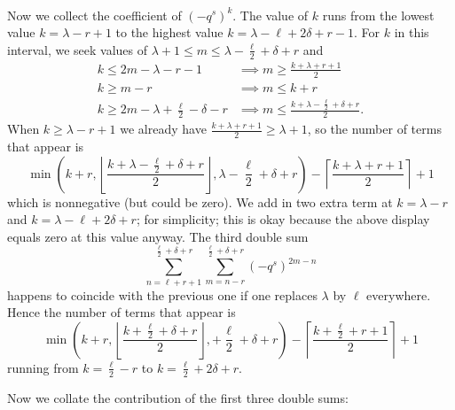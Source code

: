 \begin{itemize}
\begin{align*}
  \end{align*}
  Now we collect the coefficient of $(-q^s)^k$.
  The value of $k$ runs from the lowest value $k = \lambda - r + 1$
  to the highest value $k = \lambda-\ell+2\delta+r-1$.
  For $k$ in this interval, we seek values of $\lambda + 1 \le m \le \lambda - \frac{\ell}{2} + \delta + r$
  and
  \begin{align*}
    k \le 2m-\lambda-r-1 &\implies m \ge \frac{k+\lambda+r+1}{2} \\
    k \ge m-r &\implies m \le k + r \\
    k \ge 2m - \lambda + \frac{\ell}{2} - \delta - r
    &\implies m \le \frac{k + \lambda - \frac{\ell}{2} + \delta + r}{2}.
  \end{align*}
  When $k \ge \lambda - r + 1$ we already have $\frac{k + \lambda + r + 1}{2} \ge \lambda + 1$,
  so the number of terms that appear is
  \[ \min\left(k+r,
    \left\lfloor \frac{k + \lambda - \frac{\ell}{2} + \delta + r}{2} \right\rfloor,
    \lambda - \frac{\ell}{2} + \delta + r \right)
    - \left\lceil \frac{k+\lambda+r+1}{2} \right\rceil + 1 \]
  which is nonnegative (but could be zero).
  We add in two extra term at $k = \lambda - r$ and $k = \lambda - \ell + 2 \delta + r$;
  for simplicity; this is okay because the above display equals zero at this value anyway.
  \ii The third double sum
  \[
    \sum_{n=\ell+r+1}^{\frac{\ell}{2}+\delta+r}
      \sum_{m=n-r}^{\frac{\ell}{2}+\delta+r} (-q^s)^{2m-n}
  \]
  happens to coincide with the previous one if one replaces $\lambda$ by $\ell$ everywhere.
  Hence the number of terms that appear is
  \[ \min\left(k+r,
    \left\lfloor \frac{k + \frac{\ell}{2} + \delta + r}{2} \right\rfloor,
    + \frac{\ell}{2} + \delta + r \right)
    - \left\lceil \frac{k+\frac{\ell}{2}+r+1}{2} \right\rceil + 1 \]
  running from $k = \frac{\ell}{2} - r$ to $k = \frac{\ell}{2} + 2 \delta + r$.
\end{itemize}
Now we collate the contribution of the first three double sums:
